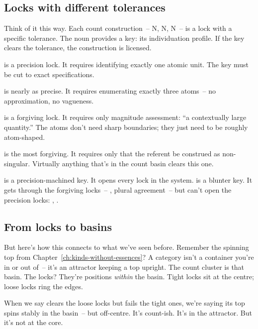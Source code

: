 \subsection{Locks with different tolerances}
\label{sec:9:locks}

Think of it this way. Each count construction~--  N,  N,  N~-- is a lock with a specific tolerance. The noun provides a key: its individuation profile. If the key clears the tolerance, the construction is licensed.

 is a precision lock. It requires identifying exactly one atomic unit. The key must be cut to exact specifications.

 is nearly as precise. It requires enumerating exactly three atoms~-- no approximation, no vagueness.

 is a forgiving lock. It requires only magnitude assessment: \enquote{a contextually large quantity.} The atoms don't need sharp boundaries; they just need to be roughly atom-shaped.

 is the most forgiving. It requires only that the referent be construed as non-singular. Virtually anything that's in the count basin clears this one.

 is a precision-machined key. It opens every lock in the system.  is a blunter key. It gets through the forgiving locks~-- , plural agreement~-- but can't open the precision locks: \ungram{}, \ungram{}.

\subsection{From locks to basins}
\label{sec:9:locks-to-basins}

But here's how this connects to what we've seen before. Remember the spinning top from Chapter~\ref{ch:kinds-without-essences}? A category isn't a container you're in or out of~-- it's an attractor keeping a top upright. The count cluster is that basin. The locks? They're positions \emph{within} the basin. Tight locks sit at the centre; loose locks ring the edges.

When we say  clears the loose locks but fails the tight ones, we're saying its top spins stably in the basin~-- but off-centre. It's count-ish. It's in the attractor. But it's not at the core.

